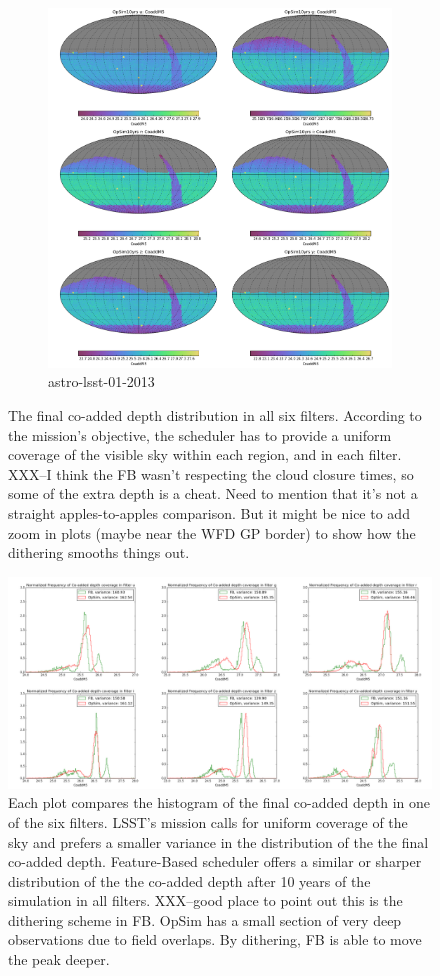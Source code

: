 \documentclass[12pt,aas_macros]{article}
\theoremstyle{definition}
\begin{document}
\begin{figure}[h!]
\begin{subfigure}{.5\textwidth}
  \includegraphics[width=.9\linewidth]{OpSim10yrs_skymap.png}
  \caption{astro-lsst-01-2013}
  \label{fig:sfig2}
\end{subfigure}
\caption{The final co-added depth distribution in all six filters. According to the mission's objective, the scheduler has to provide a uniform coverage of the visible sky within each region, and in each filter. XXX--I think the FB wasn't respecting the cloud closure times, so some of the extra depth is a cheat. Need to mention that it's not a straight apples-to-apples comparison. But it might be nice to add zoom in plots (maybe near the WFD GP border) to show how the dithering smooths things out.}
\label{fig_10yrs_skymap}
\end{figure}

\begin{figure}[h!]
\includegraphics[width=.9\linewidth]{Co_addedHist10yrs.png}
\caption{Each plot compares the histogram of the final co-added depth in one of the six filters. LSST's mission calls for uniform coverage of the sky and prefers a smaller variance in the distribution of the the final co-added depth. Feature-Based scheduler offers a similar or sharper distribution of the the co-added depth after 10 years of the simulation in all filters. XXX--good place to point out this is the dithering scheme in FB. OpSim has a small section of very deep observations due to field overlaps. By dithering, FB is able to move the peak deeper.}
\label{fig_10yrs_hist}
\end{figure}
\end{document}
